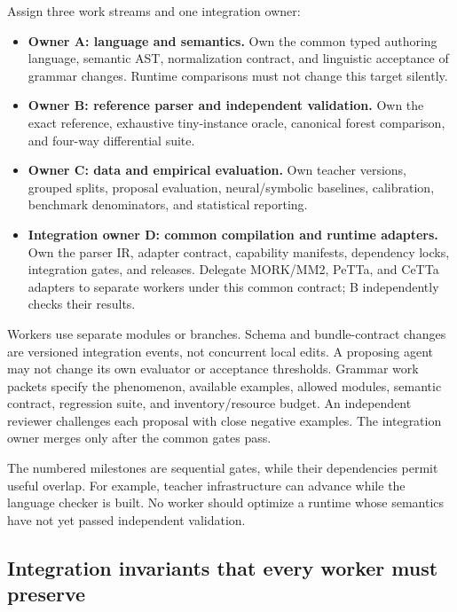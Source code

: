 \documentclass[11pt,a4paper]{article}
\begin{document}
Assign three work streams and one integration owner:
\begin{itemize}
\item \textbf{Owner A: language and semantics.} Own the common typed authoring
language, semantic AST, normalization contract, and linguistic acceptance of
grammar changes. Runtime comparisons must not change this target silently.
\item \textbf{Owner B: reference parser and independent validation.} Own the
exact reference, exhaustive tiny-instance oracle, canonical forest comparison,
and four-way differential suite.
\item \textbf{Owner C: data and empirical evaluation.} Own teacher versions,
grouped splits, proposal evaluation, neural/symbolic baselines, calibration,
benchmark denominators, and statistical reporting.
\item \textbf{Integration owner D: common compilation and runtime adapters.}
Own the parser IR, adapter contract, capability manifests, dependency locks,
integration gates, and releases. Delegate MORK/MM2, PeTTa, and CeTTa adapters
to separate workers under this common contract; B independently checks their
results.
\end{itemize}

Workers use separate modules or branches. Schema and bundle-contract changes are versioned integration events, not concurrent local edits. A proposing agent may not change its own evaluator or acceptance thresholds. Grammar work packets specify the phenomenon, available examples, allowed modules, semantic contract, regression suite, and inventory/resource budget. An independent reviewer challenges each proposal with close negative examples. The integration owner merges only after the common gates pass.

The numbered milestones are sequential gates, while their dependencies permit useful overlap. For example, teacher infrastructure can advance while the language checker is built. No worker should optimize a runtime whose semantics have not yet passed independent validation.

\subsection{Integration invariants that every worker must preserve}
\end{document}
